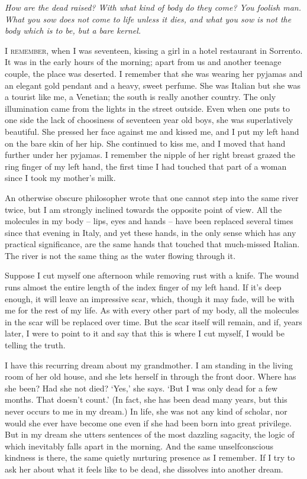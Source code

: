 \textit{How are the dead raised? With what kind of body do they come? You foolish man. What you sow does not come to life unless it dies, and what you sow is not the body which is to be, but a bare kernel.}

\bigskip

\textsc{I remember}, when I was seventeen, kissing a girl in a hotel restaurant in Sorrento. It was in the early hours of the morning; apart from us and another teenage couple, the place was deserted. I remember that she was wearing her pyjamas and an elegant gold pendant and a heavy, sweet perfume. She was Italian but she was a tourist like me, a Venetian; the south is really another country. The only illumination came from the lights in the street outside. Even when one puts to one side the lack of choosiness of seventeen year old boys, she was superlatively beautiful. She pressed her face against me and kissed me, and I put my left hand on the bare skin of her hip. She continued to kiss me, and I moved that hand further under her pyjamas. I remember the nipple of her right breast grazed the ring finger of my left hand, the first time I had touched that part of a woman since I took my mother's milk.

An otherwise obscure philosopher wrote that one cannot step into the same river twice, but I am strongly inclined towards the opposite point of view. All the molecules in my body -- lips, eyes and hands -- have been replaced several times since that evening in Italy, and yet these hands, in the only sense which has any practical significance, are the same hands that touched that much-missed Italian. The river is not the same thing as the water flowing through it.

\prosesep

Suppose I cut myself one afternoon while removing rust with a knife. The wound runs almost the entire length of the index finger of my left hand. If it's deep enough, it will leave an impressive scar, which, though it may fade, will be with me for the rest of my life. As with every other part of my body, all the molecules in the scar will be replaced over time. But the scar itself will remain, and if, years later, I were to point to it and say that this is where I cut myself, I would be telling the truth.

\prosesep

I have this recurring dream about my grandmother. I am standing in the living room of her old house, and she lets herself in through the front door. Where has she been? Had she not died? `Yes,' she says. `But I was only dead for a few months. That doesn't count.' (In fact, she has been dead many years, but this never occurs to me in my dream.) In life, she was not any kind of scholar, nor would she ever have become one even if she had been born into great privilege. But in my dream she utters sentences of the most dazzling sagacity, the logic of which inevitably falls apart in the morning. And the same unselfconscious kindness is there, the same quietly nurturing presence as I remember. If I try to ask her about what it feels like to be dead, she dissolves into another dream.

